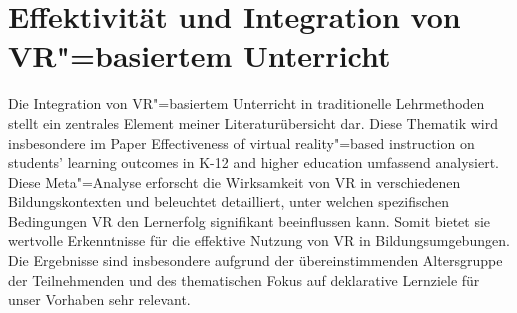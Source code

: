 \documentclass[draft]{vutinfth} %
\begin{document}
\section{Effektivität und Integration von VR"=basiertem Unterricht}

Die Integration von VR"=basiertem Unterricht in traditionelle Lehrmethoden stellt ein zentrales Element meiner Literaturübersicht dar. Diese Thematik wird insbesondere im Paper \glqq Effectiveness of virtual reality"=based instruction on students' learning outcomes in K-12 and higher education\grqq\cite{merchant2014effectiveness} umfassend analysiert. Diese Meta"=Analyse erforscht die Wirksamkeit von VR in verschiedenen Bildungskontexten und beleuchtet detailliert, unter welchen spezifischen Bedingungen VR den Lernerfolg signifikant beeinflussen kann. Somit bietet sie wertvolle Erkenntnisse für die effektive Nutzung von VR in Bildungsumgebungen. Die Ergebnisse sind insbesondere aufgrund der übereinstimmenden Altersgruppe der Teilnehmenden und des thematischen Fokus auf deklarative Lernziele für unser Vorhaben sehr relevant.
\end{document}
